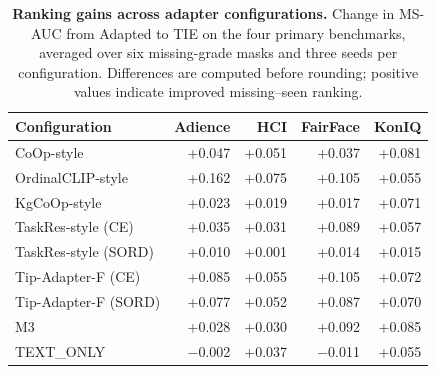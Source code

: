 \begin{table}[!t]
\centering
\caption{\textbf{Ranking gains across adapter configurations.}
Change in MS-AUC from Adapted to TIE on the four primary benchmarks, averaged over six missing-grade masks and three seeds per configuration. Differences are computed before rounding; positive values indicate improved missing--seen ranking.}
\label{tab:per_adapter}
\footnotesize
\setlength{\tabcolsep}{2.3pt}
\begin{tabular*}{\columnwidth}{@{\extracolsep{\fill}}lrrrr@{}}
\toprule
Configuration & Adience & HCI & FairFace & KonIQ \\
\midrule
CoOp-style & +0.047 & +0.051 & +0.037 & +0.081 \\
OrdinalCLIP-style & +0.162 & +0.075 & +0.105 & +0.055 \\
KgCoOp-style & +0.023 & +0.019 & +0.017 & +0.071 \\
TaskRes-style (CE) & +0.035 & +0.031 & +0.089 & +0.057 \\
TaskRes-style (SORD) & +0.010 & +0.001 & +0.014 & +0.015 \\
Tip-Adapter-F (CE) & +0.085 & +0.055 & +0.105 & +0.072 \\
Tip-Adapter-F (SORD) & +0.077 & +0.052 & +0.087 & +0.070 \\
M3 & +0.028 & +0.030 & +0.092 & +0.085 \\
TEXT\_ONLY & $-$0.002 & +0.037 & $-$0.011 & +0.055 \\
\bottomrule
\end{tabular*}
\end{table}

